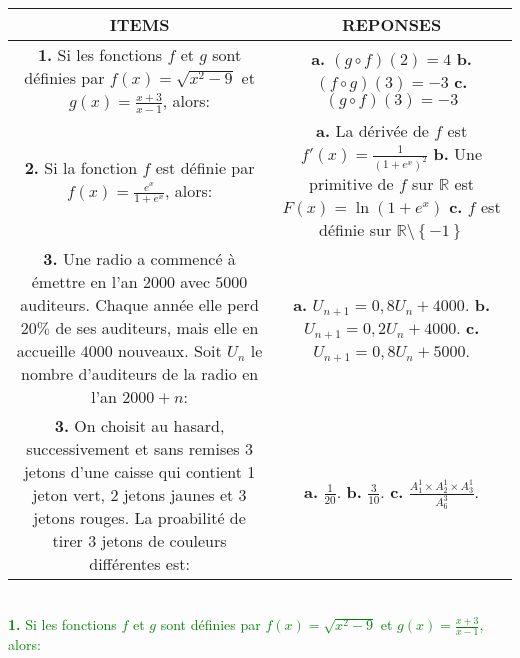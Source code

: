 \documentclass[12pt]{article}
\begin{document}
\begin{tabular}{|c|c|}
\hline
\textbf{ITEMS} & \textbf{REPONSES}\\
\hline
\makecell[l]{\textbf{1.} Si les fonctions $f$ et $g$ sont définies par \\ $f(x)=\sqrt{x^{2}-9}$ et $g(x)=\frac{x+3}{x-1}$, alors:} &
\makecell[l]{\textbf{a.} $(g\circ f)(2)=4$ \\ \textbf{b.} $(f\circ g)(3)=-3$ \\ \textbf{c.} $(g\circ f)(3)=-3$}\\
\hline
\makecell[l]{\textbf{2.} Si la fonction $f$ est définie par \\ $f(x)=\frac{e^{x}}{1+e^{x}}$, alors:} &
\makecell[l]{\textbf{a.} La dérivée de $f$ est $f'(x)=\frac{1}{\left(1+e^{x}\right)^{2}}$ \\ \textbf{b.} Une primitive de $f$ sur $\mathbb{R}$ est\\ $F(x)=\ln(1+e^{x})$ \\ \textbf{c.} $f$ est définie sur $\mathbb{R}\setminus\left\lbrace -1\right\rbrace $}\\ 
\hline
\makecell[l]{\textbf{3.} Une radio a commencé à émettre en l'an $2000$\\ avec $5000$ auditeurs. Chaque année elle perd \\ $20\%$ de ses auditeurs, mais elle en accueille $4000$\\ nouveaux. Soit $U_{n}$ le nombre d'auditeurs de la\\ radio en  l'an $2000+n$: } & \makecell[l]{\textbf{a.} $U_{n+1}=0,8U_{n}+4000$. \\ 
\textbf{b.} $U_{n+1}=0,2U_{n}+4000$. \\ \textbf{c.} $U_{n+1}=0,8U_{n}+5000$. }\\
\hline
\makecell[l]{\textbf{3.} On choisit au hasard, successivement et sans\\ remises $3$ jetons d'une caisse qui contient 1 jeton\\ vert, 2 jetons jaunes et 3 jetons rouges.\\ La proabilité de tirer 3 jetons de couleurs différentes est:} & 
\makecell[l]{\textbf{a.} $\frac{1}{20}$. \\ 
\textbf{b.} $\frac{3}{10}$. \\ \textbf{c.} $\frac{ A_{1}^{1}\times A_{2}^{1}\times A_{3}^{1}}{ A_{6}^{3} }$. }\\
\hline
\end{tabular}\\

\textcolor{green}{\textbf{1.} Si les fonctions $f$ et $g$ sont définies par  $f(x)=\sqrt{x^{2}-9}$ et $g(x)=\frac{x+3}{x-1}$, alors:}
\end{document}
